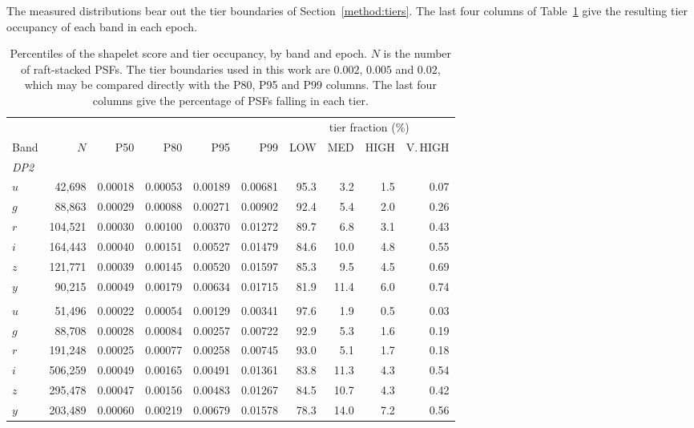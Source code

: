\documentclass[]{spie}
\begin{document}
The measured distributions bear out the tier boundaries of Section~\ref{method:tiers}. The
last four columns of Table~\ref{tab:percentiles} give the resulting tier occupancy of each
band in each epoch.

\begin{table}[htbp]
\caption{Percentiles of the shapelet score and tier occupancy, by band and epoch. $N$ is the
number of raft-stacked PSFs. The tier boundaries used in this work are $0.002$, $0.005$ and
$0.02$, which may be compared directly with the P80, P95 and P99 columns. The last four
columns give the percentage of PSFs falling in each tier.}
\label{tab:percentiles}
\begin{center}
\begin{tabular}{lrrrrrrrrr}
\toprule
 & & & & & & \multicolumn{4}{c}{tier fraction (\%)} \\
\cmidrule(l){7-10}
Band & $N$ & P50 & P80 & P95 & P99 & LOW & MED & HIGH & V.\,HIGH \\
\midrule
\multicolumn{10}{l}{\textit{DP2}} \\
\quad $u$ & 42,698 & 0.00018 & 0.00053 & 0.00189 & 0.00681 & 95.3 & 3.2 & 1.5 & 0.07 \\
\quad $g$ & 88,863 & 0.00029 & 0.00088 & 0.00271 & 0.00902 & 92.4 & 5.4 & 2.0 & 0.26 \\
\quad $r$ & 104,521 & 0.00030 & 0.00100 & 0.00370 & 0.01272 & 89.7 & 6.8 & 3.1 & 0.43 \\
\quad $i$ & 164,443 & 0.00040 & 0.00151 & 0.00527 & 0.01479 & 84.6 & 10.0 & 4.8 & 0.55 \\
\quad $z$ & 121,771 & 0.00039 & 0.00145 & 0.00520 & 0.01597 & 85.3 & 9.5 & 4.5 & 0.69 \\
\quad $y$ & 90,215 & 0.00049 & 0.00179 & 0.00634 & 0.01715 & 81.9 & 11.4 & 6.0 & 0.74 \\
\addlinespace
\multicolumn{10}{l}{\textit{Post-DP2}} \\
\quad $u$ & 51,496 & 0.00022 & 0.00054 & 0.00129 & 0.00341 & 97.6 & 1.9 & 0.5 & 0.03 \\
\quad $g$ & 88,708 & 0.00028 & 0.00084 & 0.00257 & 0.00722 & 92.9 & 5.3 & 1.6 & 0.19 \\
\quad $r$ & 191,248 & 0.00025 & 0.00077 & 0.00258 & 0.00745 & 93.0 & 5.1 & 1.7 & 0.18 \\
\quad $i$ & 506,259 & 0.00049 & 0.00165 & 0.00491 & 0.01361 & 83.8 & 11.3 & 4.3 & 0.54 \\
\quad $z$ & 295,478 & 0.00047 & 0.00156 & 0.00483 & 0.01267 & 84.5 & 10.7 & 4.3 & 0.42 \\
\quad $y$ & 203,489 & 0.00060 & 0.00219 & 0.00679 & 0.01578 & 78.3 & 14.0 & 7.2 & 0.56 \\
\bottomrule
\end{tabular}
\end{center}
\end{table}
\end{document}
